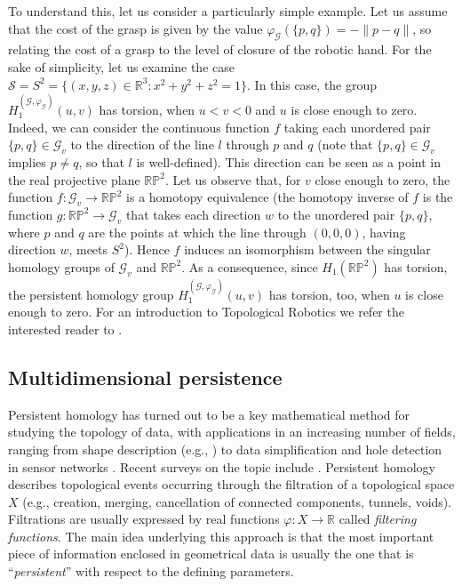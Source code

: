 \documentclass{amsart}
\theoremstyle{definition}
\theoremstyle{remark}
\newcommand{\p}{\varphi}
\newcommand{\R}{\mathbb{R}}
\numberwithin{equation}{section}
\begin{document}
To understand this, let us consider a particularly simple example.
Let us assume that the cost of the grasp is given by the value $\varphi_\mathcal{G}(\{p,q\})=-\|p-q\|$, so relating the cost of a grasp to the level of closure of the robotic hand. For the sake of simplicity, let us examine the case $\mathcal{S}=S^2=\{(x,y,z)\in\R^3:x^2+y^2+z^2=1\}$. In this case, the group ${H}_1^{(\mathcal{G},\p_\mathcal{G})}(u,v)$ has torsion, when $u<v<0$ and $u$ is close enough to zero. Indeed, we can consider the continuous function $f$ taking each unordered pair $\{p,q\}\in \mathcal{G}_v$ to the direction of the line $l$ through $p$ and $q$ (note that $\{p,q\}\in \mathcal{G}_v$ implies $p\neq q$, so that $l$ is well-defined). This direction can be seen as a point in the real projective plane $\mathbb{RP}^2$. Let us observe that, for $v$ close enough to zero, the function $f:\mathcal{G}_v\to \mathbb{RP}^2$ is a homotopy equivalence (the homotopy inverse of $f$ is the function $g:\mathbb{RP}^2\to \mathcal{G}_v$ that takes each direction $w$ to the unordered pair $\{p,q\}$, where $p$ and $q$ are the points at which the line through $(0,0,0)$, having direction $w$, meets $S^2$). Hence $f$ induces an isomorphism between the singular homology groups of $\mathcal{G}_v$ and $\mathbb{RP}^2$. As a consequence, since $H_1(\mathbb{RP}^2)$ has torsion, the persistent homology group ${H}_1^{(\mathcal{G},\p_\mathcal{G})}(u,v)$ has torsion, too, when $u$ is close enough to zero.
For an introduction to Topological Robotics we refer the interested reader to \cite{Fa08}.


\subsection*{Multidimensional persistence}
Persistent homology has turned out to
be a key mathematical method for studying the topology of data,
with applications in an increasing number of fields, ranging from
shape description (e.g., \cite{CaZo*05,CeFeGi06,MoSaSa08,VeUrFrFe93}) to data
simplification \cite{EdLeZo02} and hole detection in sensor networks \cite{DeGh07}. Recent surveys on the topic include \cite{EdHa08,EdHa09,Gh08,Zo05}.
Persistent homology describes topological events occurring through
the filtration of a topological space $X$ (e.g., creation, merging, cancellation of
connected components, tunnels, voids). Filtrations are usually
expressed by real functions $\p:X\to\R$ called {\em filtering
functions}. The main idea underlying this approach is that the
most important piece of information enclosed in geometrical data
is usually the one that is ``\emph{persistent}'' with respect to
the defining parameters.
\end{document}
